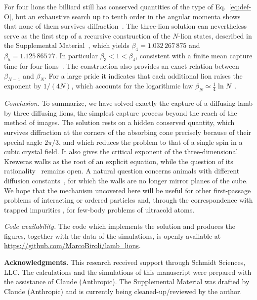 \documentclass[aps,prl,twocolumn,superscriptaddress,floatfix,nofootinbib]{revtex4-2}
\begin{document}
For four lions the billiard still has conserved quantities of the type of Eq.~\eqref{eq:def-O}, but an exhaustive search up to tenth order in the angular momenta shows that none of them survives diffraction~\cite{SM}. The three-lion solution can nevertheless serve as the first step of a recursive construction of the $N$-lion states, described in the Supplemental Material~\cite{SM}, which yields $\beta_4=1.032\,267\,875$ and $\beta_5=1.125\,865\,77$. In particular $\beta_3<1<\beta_4$, consistent with a finite mean capture time for four lions~\cite{RT09}. The construction also provides an exact relation between $\beta_{N-1}$ and $\beta_N$. For a large pride it indicates that each additional lion raises the exponent by $1/(4N)$, which accounts for the logarithmic law $\beta_N\simeq\frac14\ln N$~\cite{KR96,LS02,SM}.


\emph{Conclusion.} To summarize, we have solved exactly the capture of a diffusing lamb by three diffusing lions, the simplest capture process beyond the reach of the method of images. The solution rests on a hidden conserved quantity, which survives diffraction at the corners of the absorbing cone precisely because of their special angle $2\pi/3$, and which reduces the problem to that of a single spin in a cubic crystal field. It also gives the critical exponent of the three-dimensional Kreweras walks as the root of an explicit equation, while the question of its rationality~\cite{BPRT20,HJR24} remains open. A natural question concerns animals with different diffusion constants~\cite{KR96,RK99}, for which the walls are no longer mirror planes of the cube. We hope that the mechanism uncovered here will be useful for other first-passage problems of interacting or ordered particles and, through the correspondence with trapped impurities \cite{SM,ZVFJV14,HODVJZ17,RIJ24}, for few-body problems of ultracold atoms.



\emph{Code availability.} The code which implements the solution and produces the figures, together with the data of the simulations, is openly available at \url{https://github.com/MarcoBiroli/lamb_lions}.

\begin{acknowledgments}
    {\bf Acknowledgments.} This research received support through Schmidt Sciences, LLC. The calculations and the simulations of this manuscript were prepared with the assistance of Claude (Anthropic). The Supplemental Material was drafted by Claude (Anthropic) and is currently being cleaned-up/reviewed by the author.
\end{acknowledgments}




\end{document}
